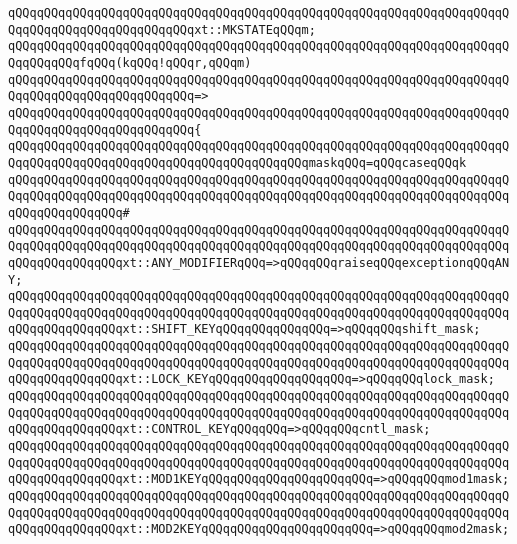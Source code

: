 \verb|qQQqqQQqqQQqqQQqqQQqqQQqqQQqqQQqqQQqqQQqqQQqqQQqqQQqqQQqqQQqqQQqqQQqqQQqqQQqqQQqqQQqqQQqqQQqqQQqxt::MKSTATEqQQqm;|\newline
\newline
\verb|qQQqqQQqqQQqqQQqqQQqqQQqqQQqqQQqqQQqqQQqqQQqqQQqqQQqqQQqqQQqqQQqqQQqqQQqqQQqqQQqfqQQq(kqQQq!qQQqr,qQQqm)|\newline
\verb|qQQqqQQqqQQqqQQqqQQqqQQqqQQqqQQqqQQqqQQqqQQqqQQqqQQqqQQqqQQqqQQqqQQqqQQqqQQqqQQqqQQqqQQqqQQqqQQq=>|\newline
\verb|qQQqqQQqqQQqqQQqqQQqqQQqqQQqqQQqqQQqqQQqqQQqqQQqqQQqqQQqqQQqqQQqqQQqqQQqqQQqqQQqqQQqqQQqqQQqqQQq{|\newline
\verb|qQQqqQQqqQQqqQQqqQQqqQQqqQQqqQQqqQQqqQQqqQQqqQQqqQQqqQQqqQQqqQQqqQQqqQQqqQQqqQQqqQQqqQQqqQQqqQQqqQQqqQQqqQQqqQQqmaskqQQq=qQQqcaseqQQqk|\newline
\verb|qQQqqQQqqQQqqQQqqQQqqQQqqQQqqQQqqQQqqQQqqQQqqQQqqQQqqQQqqQQqqQQqqQQqqQQqqQQqqQQqqQQqqQQqqQQqqQQqqQQqqQQqqQQqqQQqqQQqqQQqqQQqqQQqqQQqqQQqqQQqqQQqqQQqqQQqqQQq#|\newline
\verb|qQQqqQQqqQQqqQQqqQQqqQQqqQQqqQQqqQQqqQQqqQQqqQQqqQQqqQQqqQQqqQQqqQQqqQQqqQQqqQQqqQQqqQQqqQQqqQQqqQQqqQQqqQQqqQQqqQQqqQQqqQQqqQQqqQQqqQQqqQQqqQQqqQQqqQQqqQQqxt::ANY_MODIFIERqQQq=>qQQqqQQqraiseqQQqexceptionqQQqANY;|\newline
\verb|qQQqqQQqqQQqqQQqqQQqqQQqqQQqqQQqqQQqqQQqqQQqqQQqqQQqqQQqqQQqqQQqqQQqqQQqqQQqqQQqqQQqqQQqqQQqqQQqqQQqqQQqqQQqqQQqqQQqqQQqqQQqqQQqqQQqqQQqqQQqqQQqqQQqqQQqqQQqxt::SHIFT_KEYqQQqqQQqqQQqqQQq=>qQQqqQQqshift_mask;|\newline
\verb|qQQqqQQqqQQqqQQqqQQqqQQqqQQqqQQqqQQqqQQqqQQqqQQqqQQqqQQqqQQqqQQqqQQqqQQqqQQqqQQqqQQqqQQqqQQqqQQqqQQqqQQqqQQqqQQqqQQqqQQqqQQqqQQqqQQqqQQqqQQqqQQqqQQqqQQqqQQqxt::LOCK_KEYqQQqqQQqqQQqqQQqqQQq=>qQQqqQQqlock_mask;|\newline
\verb|qQQqqQQqqQQqqQQqqQQqqQQqqQQqqQQqqQQqqQQqqQQqqQQqqQQqqQQqqQQqqQQqqQQqqQQqqQQqqQQqqQQqqQQqqQQqqQQqqQQqqQQqqQQqqQQqqQQqqQQqqQQqqQQqqQQqqQQqqQQqqQQqqQQqqQQqqQQqxt::CONTROL_KEYqQQqqQQq=>qQQqqQQqcntl_mask;|\newline
\verb|qQQqqQQqqQQqqQQqqQQqqQQqqQQqqQQqqQQqqQQqqQQqqQQqqQQqqQQqqQQqqQQqqQQqqQQqqQQqqQQqqQQqqQQqqQQqqQQqqQQqqQQqqQQqqQQqqQQqqQQqqQQqqQQqqQQqqQQqqQQqqQQqqQQqqQQqqQQqxt::MOD1KEYqQQqqQQqqQQqqQQqqQQqqQQq=>qQQqqQQqmod1mask;|\newline
\verb|qQQqqQQqqQQqqQQqqQQqqQQqqQQqqQQqqQQqqQQqqQQqqQQqqQQqqQQqqQQqqQQqqQQqqQQqqQQqqQQqqQQqqQQqqQQqqQQqqQQqqQQqqQQqqQQqqQQqqQQqqQQqqQQqqQQqqQQqqQQqqQQqqQQqqQQqqQQqxt::MOD2KEYqQQqqQQqqQQqqQQqqQQqqQQq=>qQQqqQQqmod2mask;|\newline
